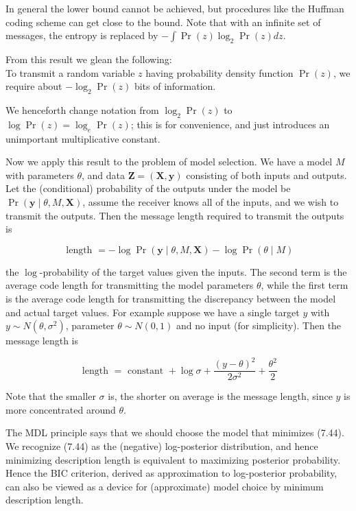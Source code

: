 \documentclass[10pt]{article}
\begin{document}
In general the lower bound cannot be achieved, but procedures like the Huffman coding scheme can get close to the bound. Note that with an infinite set of messages, the entropy is replaced by $-\int \operatorname{Pr}(z) \log _{2} \operatorname{Pr}(z) d z$.

From this result we glean the following:\\
To transmit a random variable $z$ having probability density function $\operatorname{Pr}(z)$, we require about $-\log _{2} \operatorname{Pr}(z)$ bits of information.

We henceforth change notation from $\log _{2} \operatorname{Pr}(z)$ to $\log \operatorname{Pr}(z)=\log _{e} \operatorname{Pr}(z)$; this is for convenience, and just introduces an unimportant multiplicative constant.

Now we apply this result to the problem of model selection. We have a model $M$ with parameters $\theta$, and data $\mathbf{Z}=(\mathbf{X}, \mathbf{y})$ consisting of both inputs and outputs. Let the (conditional) probability of the outputs under the model be $\operatorname{Pr}(\mathbf{y} \mid \theta, M, \mathbf{X})$, assume the receiver knows all of the inputs, and we wish to transmit the outputs. Then the message length required to transmit the outputs is


\begin{equation*}
\text { length }=-\log \operatorname{Pr}(\mathbf{y} \mid \theta, M, \mathbf{X})-\log \operatorname{Pr}(\theta \mid M) \tag{7.44}
\end{equation*}


the $\log$-probability of the target values given the inputs. The second term is the average code length for transmitting the model parameters $\theta$, while the first term is the average code length for transmitting the discrepancy between the model and actual target values. For example suppose we have a single target $y$ with $y \sim N\left(\theta, \sigma^{2}\right)$, parameter $\theta \sim N(0,1)$ and no input (for simplicity). Then the message length is


\begin{equation*}
\text { length }=\text { constant }+\log \sigma+\frac{(y-\theta)^{2}}{2 \sigma^{2}}+\frac{\theta^{2}}{2} \tag{7.45}
\end{equation*}


Note that the smaller $\sigma$ is, the shorter on average is the message length, since $y$ is more concentrated around $\theta$.

The MDL principle says that we should choose the model that minimizes (7.44). We recognize (7.44) as the (negative) log-posterior distribution, and hence minimizing description length is equivalent to maximizing posterior probability. Hence the BIC criterion, derived as approximation to log-posterior probability, can also be viewed as a device for (approximate) model choice by minimum description length.
\end{document}
